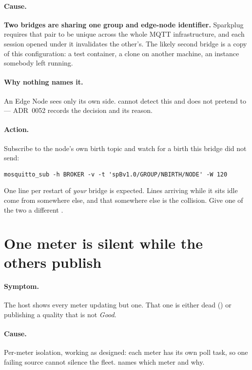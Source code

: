 \paragraph{Cause.} \textbf{Two bridges are sharing one group and edge-node identifier.} Sparkplug
requires that pair to be unique across the whole MQTT infrastructure, and each session opened under
it invalidates the other's. The likely second bridge is a copy of this configuration: a test
container, a clone on another machine, an instance somebody left running.

\paragraph{Why nothing names it.} An Edge Node sees only its own side. \prog cannot detect this
and does not pretend to --- ADR~0052 records the decision and its reason.

\paragraph{Action.} Subscribe to the node's own birth topic and watch for a birth this bridge did
not send:
\begin{verbatim}
mosquitto_sub -h BROKER -v -t 'spBv1.0/GROUP/NBIRTH/NODE' -W 120
\end{verbatim}
One line per restart of \emph{your} bridge is expected. Lines arriving while it sits idle come from
somewhere else, and that somewhere else is the collision. Give one of the two a different
.

\section{One meter is silent while the others publish}
\label{sec:trouble-one-meter}

\paragraph{Symptom.} The host shows every meter updating but one. That one is either dead
() or publishing a quality that is not \emph{Good}.

\paragraph{Cause.} Per-meter isolation, working as designed: each meter has its own poll task,
so one failing source cannot silence the fleet.  names which meter and why.

